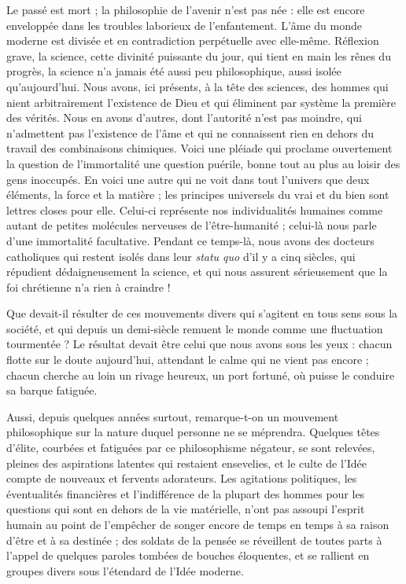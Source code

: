 \documentclass[a4paper, 11pt, oneside, landscape]{article}
\begin{document}
Le passé est mort ; la philosophie de l'avenir n'est pas née : elle est encore enveloppée dans les troubles laborieux de l'enfantement. L'âme du monde moderne est divisée et en contradiction perpétuelle avec elle-même. Réflexion grave, la science, cette divinité puissante du jour, qui tient en main les rênes du progrès, la science n'a jamais été aussi peu philosophique, aussi isolée qu'aujourd'hui. Nous avons, ici présents, à la tête des sciences, des hommes qui nient arbitrairement l'existence de Dieu et qui éliminent par système la première des vérités. Nous en avons d'autres, dont l'autorité n'est pas moindre, qui n'admettent pas l'existence de l'âme et qui ne connaissent rien en dehors du travail des combinaisons chimiques. Voici une pléiade qui proclame ouvertement la question de l'immortalité une question puérile, bonne tout au plus au loisir des gens inoccupés. En voici une autre qui ne voit dans tout l'univers que deux éléments, la force et la matière ; les principes universels du vrai et du bien sont lettres closes pour elle. Celui-ci représente nos individualités humaines comme autant de petites molécules nerveuses de l'être-humanité ; celui-là nous parle d'une immortalité facultative. Pendant ce temps-là, nous avons des docteurs catholiques qui restent isolés dans leur \emph{statu quo} d'il y a cinq siècles, qui répudient dédaigneusement la science, et qui nous assurent sérieusement que la foi chrétienne n'a rien à craindre !

Que devait-il résulter de ces mouvements divers qui s'agitent en tous sens sous la société, et qui depuis un demi-siècle remuent le monde comme une fluctuation tourmentée ? Le résultat devait être celui que nous avons sous les yeux : chacun flotte sur le doute aujourd'hui, attendant le calme qui ne vient pas encore ; chacun cherche au loin un rivage heureux, un port fortuné, où puisse le conduire sa barque fatiguée.

Aussi, depuis quelques années surtout, remarque-t-on un mouvement philosophique sur la nature duquel personne ne se méprendra. Quelques têtes d'élite, courbées et fatiguées par ce philosophisme négateur, se sont relevées, pleines des aspirations latentes qui restaient ensevelies, et le culte de l'Idée compte de nouveaux et fervents adorateurs. Les agitations politiques, les éventualités financières et l'indifférence de la plupart des hommes pour les questions qui sont en dehors de la vie matérielle, n'ont pas assoupi l'esprit humain au point de l'empêcher de songer encore de temps en temps à sa raison d'être et à sa destinée ; des soldats de la pensée se réveillent de toutes parts à l'appel de quelques paroles tombées de bouches éloquentes, et se rallient en groupes divers sous l'étendard de l'Idée moderne.
\end{document}
